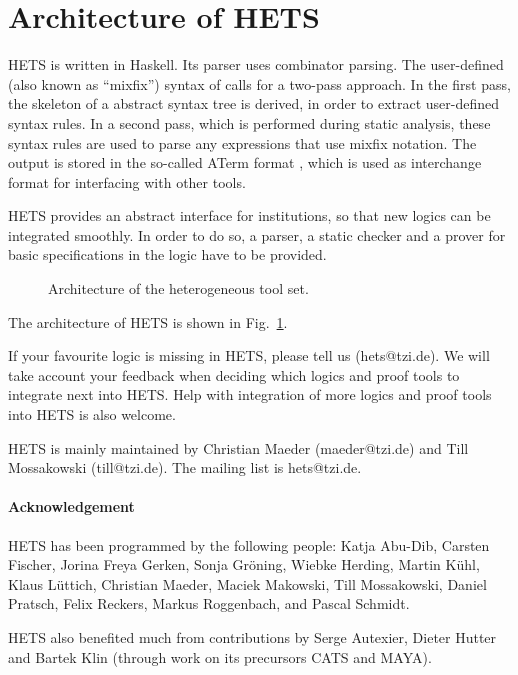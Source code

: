 \documentclass{article}
\newcommand{\normalTEXTSC}[2]{{#1\scriptsize#2}}
\newcommand     {\MAYA}{\normalTEXTSC{M}{AYA}\xspace}
\newcommand     {\Hets}{\normalTEXTSC{H}{ETS}\xspace}
\newcommand     {\Cats}{\normalTEXTSC{C}{ATS}\xspace}
\begin{document}
\section{Architecture of \Hets}

\Hets is written in Haskell. Its parser uses combinator 
parsing.
The user-defined (also known as ``mixfix'') syntax of \CASL
calls for a two-pass approach. In the first pass, the skeleton of a
\CASL abstract syntax tree is derived, in order to extract user-defined 
syntax rules. In a second pass, which is performed during 
static
analysis, these syntax rules are used to parse 
any expressions that
use mixfix notation. The output is stored in the so-called
ATerm format \cite{BJKO00}, which is used as interchange format
for interfacing with other tools.


\Hets provides an abstract interface for 
institutions, so
that new logics can be integrated smoothly. 
In order to do so, a parser,
a static checker and a prover for basic specifications in the logic have
to be provided.



\begin{figure}
\vspace{1em}

\caption{Architecture of the heterogeneous tool set.
\label{fig:hets}}
\end{figure}

The architecture of \Hets is shown in Fig.~\ref{fig:hets}. 

If your favourite logic is missing in \Hets, please tell us
(hets@tzi.de). We will take account your feedback when deciding which
logics and proof tools to integrate next into \Hets. Help with
integration of more logics and proof tools into \Hets is also welcome.

\Hets is mainly maintained by
Christian Maeder (maeder@tzi.de) and Till Mossakowski
(till@tzi.de). The mailing list is hets@tzi.de.


\paragraph{Acknowledgement}
\Hets has been programmed by the following people:
Katja Abu-Dib,
Carsten Fischer,
Jorina Freya Gerken,
Sonja Gr\"{o}ning,
Wiebke Herding,
Martin K\"{u}hl,
Klaus L\"{u}ttich,
Christian Maeder,
Maciek Makowski,
Till Mossakowski,
Daniel Pratsch,
Felix Reckers,
Markus Roggenbach, 
and
Pascal Schmidt.

\Hets also benefited much from contributions by Serge Autexier, Dieter
Hutter and Bartek Klin (through work on its precursors \Cats and
\MAYA).



\end{document}
